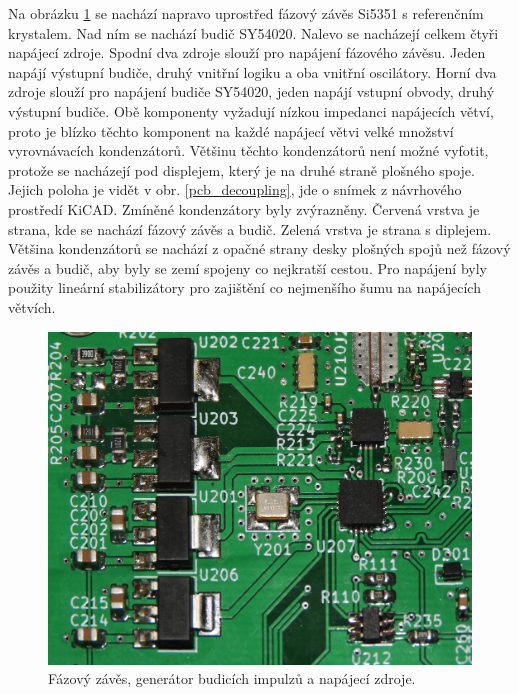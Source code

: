 Na obrázku \ref{pcb_pll_buffer} se nachází napravo uprostřed fázový závěs Si5351 s referenčním krystalem. Nad ním se nachází budič SY54020. Nalevo se nacházejí celkem čtyři napájecí zdroje. Spodní dva zdroje slouží pro napájení fázového závěsu. Jeden napájí výstupní budiče, druhý vnitřní logiku a oba vnitřní oscilátory. Horní dva zdroje slouží pro napájení budiče SY54020, jeden napájí vstupní obvody, druhý výstupní budiče. Obě komponenty vyžadují nízkou impedanci napájecích větví, proto je blízko těchto komponent na každé napájecí větvi velké množství vyrovnávacích kondenzátorů. Většinu těchto kondenzátorů není možné vyfotit, protože se nacházejí pod displejem, který je na druhé straně plošného spoje. Jejich poloha je vidět v obr. \ref{pcb_decoupling}, jde o snímek z návrhového prostředí KiCAD. Zmíněné kondenzátory byly zvýrazněny. Červená vrstva je strana, kde se nachází fázový závěs a budič. Zelená vrstva je strana s diplejem. Většina kondenzátorů se nachází z opačné strany desky plošných spojů než fázový závěs a budič, aby byly se zemí spojeny co nejkratší cestou. Pro napájení byly použity lineární stabilizátory pro zajištění co nejmenšího šumu na napájecích větvích.
\begin{figure}[htbp]
\includegraphics[width=\textwidth,keepaspectratio]{images/pcb/pcb_pll_buffer.jpg}\caption{Fázový závěs, generátor budicích impulzů a napájecí zdroje.}\label{pcb_pll_buffer}
\end{figure}

